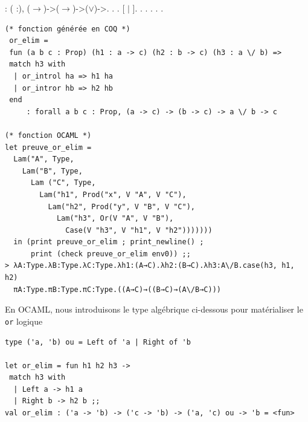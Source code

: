 \documentclass[11pt]{book}
\begin{document}
\begin{coqdoccode}
\coqdocnoindent
{} : \coqdockw{\ensuremath{\forall}} (  :), (\ensuremath{\rightarrow})->(\ensuremath{\rightarrow})->(\ensuremath{\lor})->.\coqdoceol
\coqdocnoindent
{}.\coqdoceol
\coqdocindent{1.00em}
      .\coqdoceol
\coqdocindent{1.00em}
   [ \ensuremath{|} ].\coqdoceol
\coqdocindent{1.00em}
 .  .\coqdoceol
\coqdocindent{1.00em}
 .  .\coqdoceol
\coqdocnoindent
{}.\coqdoceol
\end{coqdoccode}
\begin{Verbatim}
(* fonction générée en COQ *)
 or_elim = 
 fun (a b c : Prop) (h1 : a -> c) (h2 : b -> c) (h3 : a \/ b) =>
 match h3 with
  | or_introl ha => h1 ha
  | or_intror hb => h2 hb
 end
     : forall a b c : Prop, (a -> c) -> (b -> c) -> a \/ b -> c  

(* fonction OCAML *)
let preuve_or_elim =
  Lam("A", Type,
    Lam("B", Type,
      Lam ("C", Type,
        Lam("h1", Prod("x", V "A", V "C"),
          Lam("h2", Prod("y", V "B", V "C"),
            Lam("h3", Or(V "A", V "B"), 
              Case(V "h3", V "h1", V "h2"))))))) 
  in (print preuve_or_elim ; print_newline() ;
      print (check preuve_or_elim env0)) ;;
> λA:Type.λB:Type.λC:Type.λh1:(A→C).λh2:(B→C).λh3:A\/B.case(h3, h1, h2)
  πA:Type.πB:Type.πC:Type.((A→C)→((B→C)→(A\/B→C)))
\end{Verbatim}

En OCAML, nous introduisons le type algébrique ci-dessous pour matérialiser le \verb+or+ logique
\begin{Verbatim}
type ('a, 'b) ou = Left of 'a | Right of 'b	

let or_elim = fun h1 h2 h3 ->
 match h3 with
  | Left a -> h1 a
  | Right b -> h2 b ;;
val or_elim : ('a -> 'b) -> ('c -> 'b) -> ('a, 'c) ou -> 'b = <fun>
\end{Verbatim}
\end{document}
